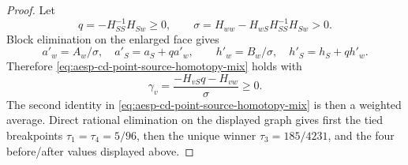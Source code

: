 \begin{proof}
Let
\begin{equation*}
 q=-H_{SS}^{-1}H_{Sw}\geq0,\qquad
 \sigma=H_{ww}-H_{wS}H_{SS}^{-1}H_{Sw}>0.
\end{equation*}
Block elimination on the enlarged face gives
\begin{equation*}
 a'_w=A_w/\sigma,\quad a'_S=a_S+qa'_w,\qquad
 h'_w=B_w/\sigma,\quad h'_S=h_S+qh'_w.
\end{equation*}
Therefore
\cref{eq:aesp-cd-point-source-homotopy-mix} holds with
\begin{equation*}
 \gamma_v=\frac{-H_{vS}q-H_{vw}}{\sigma}\geq0.
\end{equation*}
The second identity in
\cref{eq:aesp-cd-point-source-homotopy-mix} is then a weighted average.
Direct rational elimination on the displayed graph gives first the tied
breakpoints $\tau_1=\tau_4=5/96$, then the unique winner
$\tau_3=185/4231$, and the four before/after values displayed above.
\end{proof}

